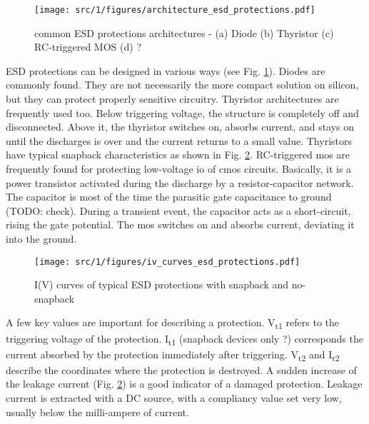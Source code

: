 \begin{figure}[!h]
  \centering
  \texttt{[image: src/1/figures/architecture\_esd\_protections.pdf]}
  \caption{common ESD protections architectures - (a) Diode (b) Thyristor (c) RC-triggered MOS (d) ?}
  \label{fig:architecture-esd-protection}
\end{figure}

ESD protections can be designed in various ways (see Fig. \ref{fig:architecture-esd-protection}).
Diodes are commonly found.
They are not necessarily the more compact solution on silicon, but they can protect properly sensitive circuitry.
Thyristor architectures are frequently used too.
Below triggering voltage, the structure is completely off and disconnected.
Above it, the thyristor switches on, absorbs current, and stays on until the discharges is over and the current returns to a small value.
Thyristors have typical snapback characteristics as shown in Fig. \ref{fig:iv-curve-esd-protection}.
RC-triggered \gls{mos} are frequently found for protecting low-voltage \gls{io} of \gls{cmos} circuits.
Basically, it is a power transistor activated during the discharge by a resistor-capacitor network.
The capacitor is most of the time the parasitic gate capacitance to ground (TODO: check).
During a transient event, the capacitor acts as a short-circuit, rising the gate potential.
The \gls{mos} switches on and absorbs current, deviating it into the ground.

\begin{figure}[!h]
  \centering
  \texttt{[image: src/1/figures/iv\_curves\_esd\_protections.pdf]}
  \caption{I(V) curves of typical ESD protections with snapback and no-snapback}
  \label{fig:iv-curve-esd-protection}
\end{figure}

A few key values are important for describing a protection.
V\textsubscript{t1} refers to the triggering voltage of the protection.
I\textsubscript{t1} (snapback devices only ?) corresponds the current absorbed by the protection immediately after triggering.
V\textsubscript{t2} and I\textsubscript{t2} describe the coordinates where the protection is destroyed.
A sudden increase of the leakage current (Fig. \ref{fig:iv-curve-esd-protection}) is a good indicator of a damaged protection.
Leakage current is extracted with a DC source, with a compliancy value set very low, usually below the milli-ampere of current.

